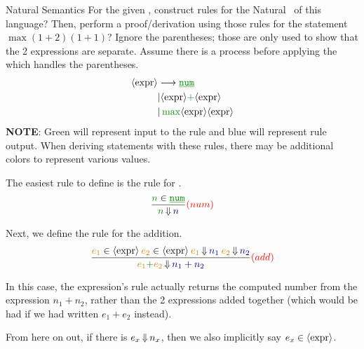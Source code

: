 \begin{example}[Lecture 3]{Natural Semantics}
  For the given , construct rules for the Natural~ of this language?
  Then, perform a proof/derivation using those rules for the statement $\max (1+2) (1+1)$?
  Ignore the parentheses; those are only used to show that the 2 expressions are separate.
  Assume there is a process before applying the  which handles the parentheses.
  \begin{align*}
    \Nonterminal{expr} &\longrightarrow \SemanticInput{\underline{\mathtt{num}}} \\
                       &\vert \Nonterminal{expr} \SemanticInput{+} \Nonterminal{expr} \\
                       &\vert \, \SemanticInput{\mathtt{\max}} \Nonterminal{expr} \Nonterminal{expr}
  \end{align*}
  \tcblower{}
  \textbf{NOTE}: Green will represent input to the rule and blue will represent rule output.
  When deriving statements with these rules, there may be additional colors to represent various values.

  The easiest rule to define is the rule for .
  \begin{equation*}
    \frac{\SemanticInput{n} \in \SemanticInput{\underline{\mathtt{num}}}}{\SemanticInput{n} \EvaluatesTo \textcolor{Blue4}{n}} \textcolor{red}{(num)}
  \end{equation*}

  Next, we define the rule for the addition.
  \begin{equation*}
    \frac{\textcolor{Orange3}{e_{1}} \in \Nonterminal{expr} \: \textcolor{Orange3}{e_{2}} \in \Nonterminal{expr} \: \textcolor{Orange3}{e_{1}} \EvaluatesTo \textcolor{Blue4}{n_{1}} \: \textcolor{Orange3}{e_{2}} \EvaluatesTo \textcolor{Blue4}{n_{2}}}{\textcolor{Orange3}{e_{1}} \SemanticInput{\mathtt{+}} \textcolor{Orange3}{e_{2}} \EvaluatesTo \textcolor{Blue4}{n_{1} + n_{2}}} \textcolor{red}{(add)}
  \end{equation*}
  \begin{remark*}
    In this case, the expression's rule actually returns the computed number from the expression $n_{1} + n_{2}$, rather than the 2 expressions added together (which would be had if we had written $e_{1} + e_{2}$ instead).
  \end{remark*}

  \begin{remark*}
    From here on out, if there is $e_{x} \operatorname{\Downarrow} n_{x}$, then we also implicitly say $e_{x} \in \langle \text{expr} \rangle$.
  \end{remark*}


\end{example}
